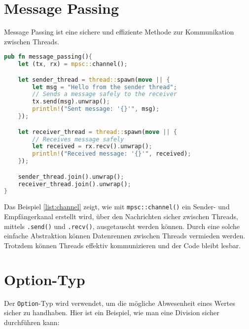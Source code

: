 \section{Message Passing}

Message Passing ist eine sichere und effiziente Methode zur Kommunikation zwischen Threads.

\begin{lstlisting}[language=Rust, caption=Message Passing ]
pub fn message_passing(){
    let (tx, rx) = mpsc::channel();

    let sender_thread = thread::spawn(move || {
        let msg = "Hello from the sender thread";
        // Sends a message safely to the receiver
        tx.send(msg).unwrap(); 
        println!("Sent message: '{}'", msg);
    });

    let receiver_thread = thread::spawn(move || {
        // Receives message safely
        let received = rx.recv().unwrap(); 
        println!("Received message: '{}'", received);
    });

    sender_thread.join().unwrap();
    receiver_thread.join().unwrap();
}
\end{lstlisting}
Das Beispiel \ref{list:channel} zeigt, wie mit \texttt{mpsc::channel()} ein Sender- und Empfängerkanal erstellt wird, über den Nachrichten sicher zwischen Threads, mittels \texttt{.send()} und \texttt{.recv()}, ausgetauscht werden können.
Durch eine solche einfache Abstraktion können Datenrennen zwischen Threads vermieden werden. 
Trotzdem können Threads effektiv kommunizieren und der Code bleibt lesbar.
\cleardoublepage
\section{Option-Typ}

Der \texttt{Option}-Typ wird verwendet, um die mögliche Abwesenheit eines Wertes sicher zu handhaben. Hier ist ein Beispiel, wie man eine Division sicher durchführen kann:

